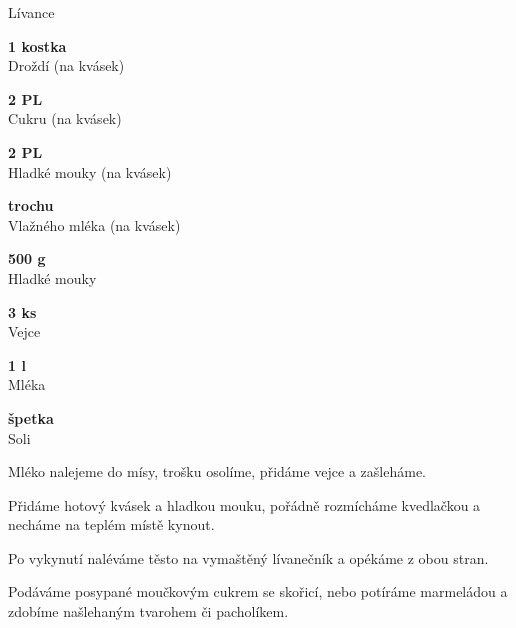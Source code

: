 \documentclass[11pt,a4paper]{article}
\begin{document}
\begin{recipe}[SandyBrown]{Lívance}
    \begin{ingredients}
        \item \parbox[t]{\linewidth}{\raggedright \piece \textbf{1 kostka}\\ Droždí (na kvásek)}
        \item \parbox[t]{\linewidth}{\raggedright \spoon \textbf{2 PL}\\ Cukru (na kvásek)}
        \item \parbox[t]{\linewidth}{\raggedright \spoon \textbf{2 PL}\\ Hladké mouky (na kvásek)}
        \item \parbox[t]{\linewidth}{\raggedright \liquid \textbf{trochu}\\ Vlažného mléka (na kvásek)}
        \item \parbox[t]{\linewidth}{\raggedright \weight \textbf{500 g}\\ Hladké mouky}
        \item \parbox[t]{\linewidth}{\raggedright \piece \textbf{3 ks}\\ Vejce}
        \item \parbox[t]{\linewidth}{\raggedright \liquid \textbf{1 l}\\ Mléka}
        \item \parbox[t]{\linewidth}{\raggedright \indefinite \textbf{špetka}\\ Soli}
    \end{ingredients}
    \begin{steps}
        \item Mléko nalejeme do mísy, trošku osolíme, přidáme vejce a zašleháme.
        \item Přidáme hotový kvásek a hladkou mouku, pořádně rozmícháme kvedlačkou a necháme na teplém místě kynout.
        \item Po vykynutí naléváme těsto na vymaštěný lívanečník a opékáme z obou stran.
        \item Podáváme posypané moučkovým cukrem se skořicí, nebo potíráme marmeládou a zdobíme našlehaným tvarohem či pacholíkem.
    \end{steps}
\end{recipe}
\end{document}
